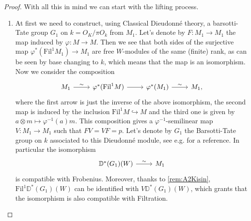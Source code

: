 \begin{proof}
With all this in mind we can start with the lifting process.
\begin{enumerate}
\item	At first we need to construct, using Classical Dieudonné theory,
	a barsotti-Tate group $G_1$ on $k = O_K/\pi O_k$ from $M_1$.
	Let's denote by $F\colon M_1 \to M_1$ the map induced by
	$\varphi\colon M \to M$.
	Then we see that both sides of the surjective map
	$\varphi^* ( \mathrm{Fil}^1 M_1) \to M_1$ are free $W$-modules of the same (finite) rank,
	as can be seen by base changing to $k$, which means that the map is an isomorphism.
	Now we consider the composition
	\begin{equation*}
	\begin{tikzcd}
		M_1 \arrow[r, "\sim", rightarrow] &
		\varphi^* (\mathrm{Fil}^1 M) \arrow[r, "", rightarrow] &
		\varphi^* (M_1) \arrow[r, "\sim", rightarrow] &
		M_1
	,\end{tikzcd}
	\end{equation*}
	where the first arrow is just the inverse of the above isomorphism, the second map
	is induced by the inclusion $\mathrm{Fil}^1 M \hookrightarrow M$ and the
	third one is given by $a \otimes m \mapsto \varphi^{-1}(a)m$.
	This composition gives a $\varphi^{-1}$-semilinear map $V\colon M_1 \to M_1$
	such that $FV = VF = p$.
	Let's denote by $G_1$ the Barsotti-Tate group on $k$ associated to this
	Dieudonné module, see e.g. \cite[Proposition 7.2.6]{Brinon} for a reference.
	In particular the isomorphism
	\begin{equation*}
	\begin{tikzcd}[row sep = 0ex
		,/tikz/column 1/.append style={anchor=base east}
		,/tikz/column 2/.append style={anchor=base west}]
		\mathbb{D}^*(G_1)(W) \arrow[r, "\sim", rightarrow] &
		M_1
	\end{tikzcd}
	\end{equation*} 
	is compatible with Frobenius.
	Moreover, thanks to \cref{rem:A2Kisin}, $\mathrm{Fil}^1 \mathbb{D}^*(G_1)(W)$
	can be identified with $V \mathbb{D}^*(G_1)(W)$, which grants that the isomorphism
	is also compatible with Filtration.


\end{enumerate}
\end{proof}
